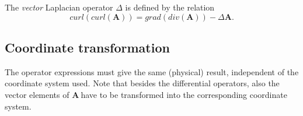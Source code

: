 The \emph{vector} Laplacian operator $\Delta$ is defined by the relation
\begin{equation}
curl\left(  curl(\mathbf{A})\right)  =grad(div(\mathbf{A}))-\Delta\mathbf{A}.
\label{eq:curlofcurl}%
\end{equation}

\subsection{\label{sec:coord}Coordinate transformation}

The operator expressions must give the same (physical) result, independent of
the coordinate system used. Note that besides the differential operators, also
the vector elements of $\mathbf{A}\ $have to be transformed into the
corresponding coordinate system.%

